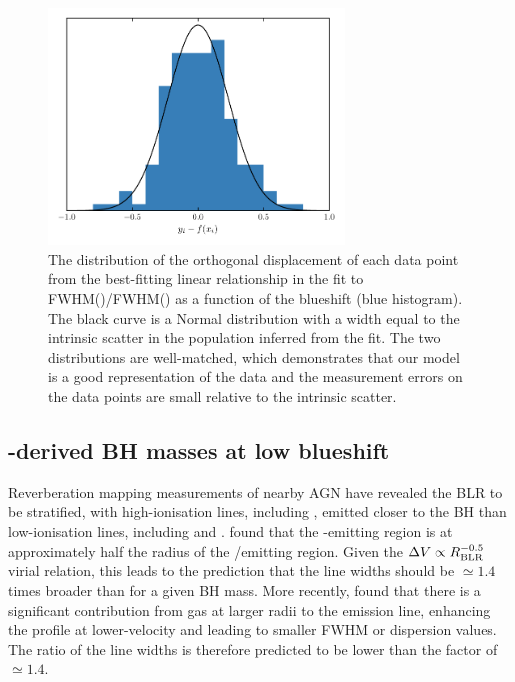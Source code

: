 \begin{figure}
    \centering 
    \includegraphics[width=0.7\textwidth]{figures/chapter03/intrinsic_scatter.pdf} 
    \caption{The distribution of the orthogonal displacement of each data point from the best-fitting linear relationship in the fit to FWHM()/FWHM(\hans) as a function of the  blueshift (blue histogram). The black curve is a Normal distribution with a width equal to the intrinsic scatter in the population inferred from the fit. The two distributions are well-matched, which demonstrates that our model is a good representation of the data and the measurement errors on the data points are small relative to the intrinsic scatter.} 
    \label{fig:intrinsic_scatter}
\end{figure}

\subsection{-derived BH masses at low  blueshift}

Reverberation mapping measurements of nearby AGN have revealed the BLR to be stratified, with high-ionisation lines, including , emitted closer to the BH than low-ionisation lines, including \ha and \hb \citep[e.g.][]{onken02}.
\citet{vestergaard06} found that the -emitting region is at approximately half the radius of the \hbns/\ha emitting region.
Given the $\Delta V \propto R_{\rm BLR}^{-0.5}$ virial relation, this leads to the prediction that the  line widths should be $\simeq 1.4$ times broader than \ha for a given BH mass. 
More recently, \citet{denney12} found that there is a significant contribution from gas at larger radii to the  emission line, enhancing the profile at lower-velocity and leading to smaller FWHM or dispersion values. 
The ratio of the line widths is therefore predicted to be lower than the factor of $\simeq 1.4$. 

